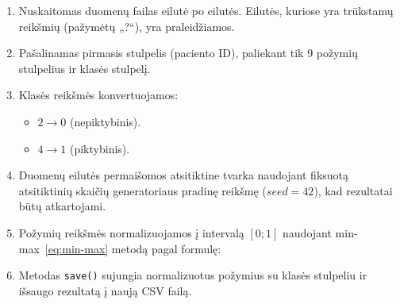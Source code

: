 \begin{enumerate}
    \item Nuskaitomas duomenų failas eilutė po eilutės. Eilutės, kuriose yra trūkstamų reikšmių (pažymėtų „?“), yra praleidžiamos.
    \item Pašalinamas pirmasis stulpelis (paciento ID), paliekant tik $9$ požymių stulpelius ir klasės stulpelį.
    \item Klasės reikšmės konvertuojamos:
        \begin{itemize}
            \item $2 \rightarrow 0$ (nepiktybinis).
            \item $4 \rightarrow 1$ (piktybinis).
        \end{itemize}
    \item Duomenų eilutės permaišomos atsitiktine tvarka naudojant fiksuotą atsitiktinių skaičių generatoriaus pradinę reikšmę ($seed=42$), kad rezultatai būtų atkartojami.
    \item Požymių reikšmės normalizuojamos į intervalą $[0; 1]$ naudojant min-max~\eqref{eq:min-max} metodą pagal formulę:
    
    \item Metodas \texttt{save()} sujungia normalizuotus požymius su klasės stulpeliu ir išsaugo rezultatą į naują CSV failą.
\end{enumerate}